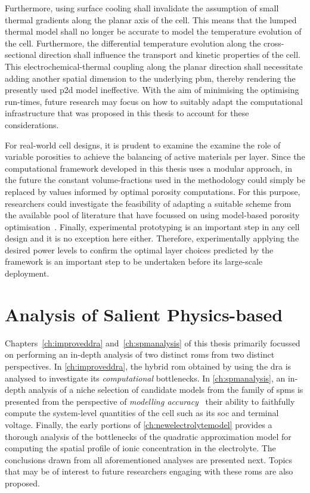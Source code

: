 Furthermore,  using surface  cooling shall  invalidate the  assumption of  small
thermal gradients along the planar axis of  the cell. This means that the lumped
thermal model  shall no longer  be accurate  to model the  temperature evolution
of  the cell.  Furthermore,  the differential  temperature  evolution along  the
cross-sectional direction  shall influence the transport  and kinetic properties
of the  cell. This electrochemical-thermal  coupling along the  planar direction
shall necessitate adding another spatial  dimension to the underlying \gls{pbm},
thereby rendering the  presently used \gls{p2d} model ineffective.  With the aim
of minimising  the optimising  run-times, future  research may  focus on  how to
suitably adapt the computational infrastructure that was proposed in this thesis
to account for these considerations.

For  real-world cell  designs, it  is prudent  to examine  the examine  the role
of  variable  porosities  to  achieve  the balancing  of  active  materials  per
layer.  Since  the computational  framework  developed  in  this thesis  uses  a
modular  approach, in  the  future  the constant  volume-fractions  used in  the
methodology  could simply  be replaced  by values  informed by  optimal porosity
computations. For this purpose, researchers could investigate the feasibility of
adapting  a suitable  scheme from  the available  pool of  literature that  have
focussed  on  using  model-based  porosity  optimisation~\cite{Xue2013,Xue2014,
Christensen2006}. Finally, experimental prototyping is  an important step in any
cell  design and  it  is  no exception  here  either. Therefore,  experimentally
applying the desired power levels to confirm the optimal layer choices predicted
by the  framework is an important  step to be undertaken  before its large-scale
deployment.


\section{Analysis of Salient Physics-based }

Chapters~\ref{ch:improveddra} and~\ref{ch:spmanalysis} of  this thesis primarily
focussed on performing an in-depth analysis of two distinct \glspl{rom} from two
distinct perspectives.  In \cref{ch:improveddra}, the hybrid  \gls{rom} obtained
by  using the  \gls{dra}  is analysed  to  investigate its  \emph{computational}
bottlenecks. In \cref{ch:spmanalysis}, an in-depth analysis of a niche selection
of  candidate models  from  the  family of  \glspl{spm}  is  presented from  the
perspective of \emph{modelling accuracy} \ie~their ability to faithfully compute
the  system-level quantities  of the  cell such  as its  \gls{soc} and  terminal
voltage. Finally, the early portions of \cref{ch:newelectrolytemodel} provides a
thorough analysis  of the bottlenecks  of the quadratic approximation  model for
computing the  spatial profile  of ionic concentration  in the  electrolyte. The
conclusions drawn  from all aforementioned  analyses are presented  next. Topics
that may  be of interest to  future researchers engaging with  these \glspl{rom}
are also proposed.

